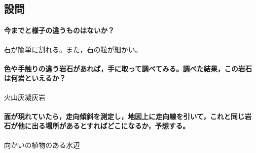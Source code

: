 \documentclass[uplatex,b5paper]{jsreport}
\begin{document}
    \subsection{設問}
      \paragraph{今までと様子の違うものはないか？}
      石が簡単に割れる。また，石の粒が細かい。
      \paragraph{色や手触りの違う岩石があれば，手に取って調べてみる。調べた結果，この岩石は何岩といえるか？}
      火山灰凝灰岩
      \paragraph{面が現れていたら，走向傾斜を測定し，地図上に走向線を引いて，これと同じ岩石が他に出る場所があるとすればどこになるか，予想する。}
      向かいの植物のある水辺
\end{document}
